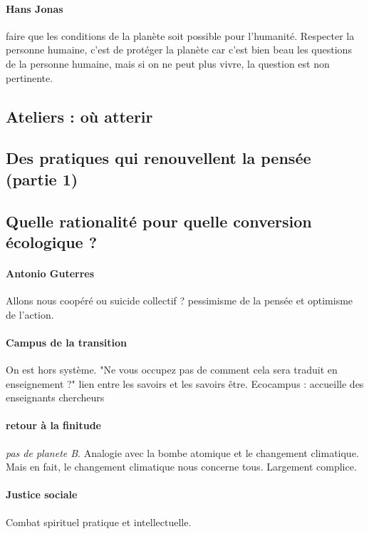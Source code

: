 \paragraph{Hans Jonas} faire que les conditions de la planète soit possible pour l'humanité. Respecter la personne humaine, c'est de protéger la planète car c'est bien beau les questions de la personne humaine, mais si on ne peut plus vivre, la question est non pertinente.



\subsection{Ateliers : où atterir}

\subsection{Des pratiques qui renouvellent la pensée (partie 1)}


\subsection{Quelle rationalité pour quelle conversion écologique ?}

\paragraph{Antonio Guterres} Allons nous coopéré ou suicide collectif ? pessimisme de la pensée et optimisme de l'action.

\paragraph{Campus de la transition} On est hors système. "Ne vous occupez pas de comment cela sera traduit en enseignement ?" lien entre les savoirs et les savoirs être. Ecocampus : accueille des enseignants chercheurs

\paragraph{retour à la finitude} \textit{pas de planete B}.  Analogie avec la bombe atomique et le changement climatique. Mais en fait, le changement climatique nous concerne tous. Largement complice. 

\paragraph{Justice sociale} Combat spirituel pratique et intellectuelle.

